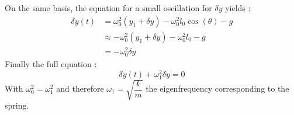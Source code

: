 	On the same basis, the equation for a small oscillation for $\delta y$ yields : 
	\begin{align*}
	\delta\ddot{y}(t)&=\omega_0^2(y_1 +\delta y)-\omega_0^2l_0\cos(\theta)-g\\
	&\approx -\omega_0^2(y_1+\delta y) - \omega_0^2l_0-g\\
	&=-\omega_0^2\delta y
	\end{align*}
	Finally the full equation :
	\begin{equation}
	\delta \ddot{y}(t)+\omega_1^2\delta y=0
	\end{equation}
	With $\omega_0^2=\omega_1^2$ and therefore $\omega_1=\sqrt{\dfrac{k}{m}}$ the eigenfrequency corresponding to the spring.





